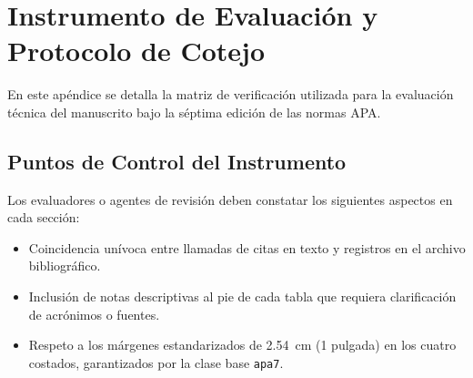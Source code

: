 \appendix

\section{Instrumento de Evaluación y Protocolo de Cotejo}\label{ap:instrumento}

En este apéndice se detalla la matriz de verificación utilizada para la evaluación técnica del manuscrito bajo la séptima edición de las normas APA.

\subsection{Puntos de Control del Instrumento}
Los evaluadores o agentes de revisión deben constatar los siguientes aspectos en cada sección:
\begin{itemize}
    \item Coincidencia unívoca entre llamadas de citas en texto y registros en el archivo bibliográfico.
    \item Inclusión de notas descriptivas al pie de cada tabla que requiera clarificación de acrónimos o fuentes.
    \item Respeto a los márgenes estandarizados de 2.54~cm (1 pulgada) en los cuatro costados, garantizados por la clase base \texttt{apa7}.
\end{itemize}
